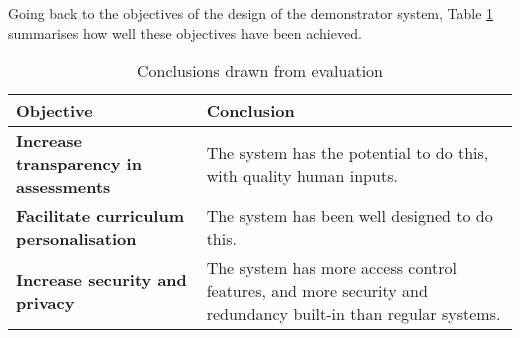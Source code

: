 Going back to the objectives of the design of the demonstrator system,
Table \ref{table:eval_conclusion} summarises how well these objectives have been achieved.

\begin{table}[!ht]
	\caption{Conclusions drawn from evaluation}
	\label{table:eval_conclusion}
	\begin{tabularx}{\textwidth}{|>{\bfseries}l|X|}
		\hline
		Objective & Conclusion
		\\\hline
		Increase transparency in assessments & The system has the potential to do this, with quality human inputs.
		\\\hline
		Facilitate curriculum personalisation & The system has been well designed to do this.
		\\\hline	
		Increase security and privacy & The system has more access control features, and more security and redundancy built-in than regular systems.
		\\\hline
	\end{tabularx}
\end{table}



